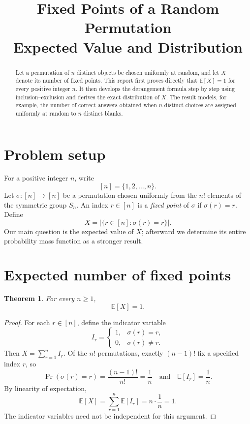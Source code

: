 \documentclass[11pt,a4paper]{article}
\title{\textbf{Fixed Points of a Random Permutation}\\
  \large Expected Value and Distribution}
\author{}
\date{}
\newtheorem{theorem}{Theorem}
\begin{document}
\newcommand{\EditionName}{Revised English edition}
\newcommand{\EditionSummary}{%
  This edition is a corrected, self-contained report based on the
  mathematical question in the source video.}


\maketitle
\vspace{-2em}

\begin{abstract}
Let a permutation of \(n\) distinct objects be chosen uniformly at random,
and let \(X\) denote its number of fixed points. This report first proves
directly that \(\mathbb{E}[X]=1\) for every positive integer \(n\). It then
develops the derangement formula step by step using inclusion--exclusion and
derives the exact distribution of \(X\). The result models, for example, the
number of correct answers obtained when \(n\) distinct choices are assigned
uniformly at random to \(n\) distinct blanks.
\end{abstract}

\section{Problem setup}

For a positive integer \(n\), write
\[
  [n]=\{1,2,\ldots,n\}.
\]
Let \(\sigma:[n]\to[n]\) be a permutation chosen uniformly from the \(n!\)
elements of the symmetric group \(S_n\). An index \(r\in[n]\) is a
\emph{fixed point} of \(\sigma\) if \(\sigma(r)=r\). Define
\[
  X=\bigl|\{r\in[n]:\sigma(r)=r\}\bigr|.
\]
Our main question is the expected value of \(X\); afterward we determine its
entire probability mass function as a stronger result.

\section{Expected number of fixed points}

\begin{theorem}
For every \(n\geq 1\),
\[
  \mathbb{E}[X]=1.
\]
\end{theorem}

\begin{proof}
For each \(r\in[n]\), define the indicator variable
\[
  I_r=
  \begin{cases}
    1, & \sigma(r)=r,\\
    0, & \sigma(r)\ne r.
  \end{cases}
\]
Then \(X=\sum_{r=1}^{n}I_r\). Of the \(n!\) permutations, exactly
\((n-1)!\) fix a specified index \(r\), so
\[
  \Pr(\sigma(r)=r)=\frac{(n-1)!}{n!}=\frac{1}{n}
  \quad\text{and}\quad
  \mathbb{E}[I_r]=\frac{1}{n}.
\]
By linearity of expectation,
\[
  \mathbb{E}[X]
    =\sum_{r=1}^{n}\mathbb{E}[I_r]
    =n\cdot\frac{1}{n}
    =1.
\]
The indicator variables need not be independent for this argument.
\end{proof}
\end{document}
